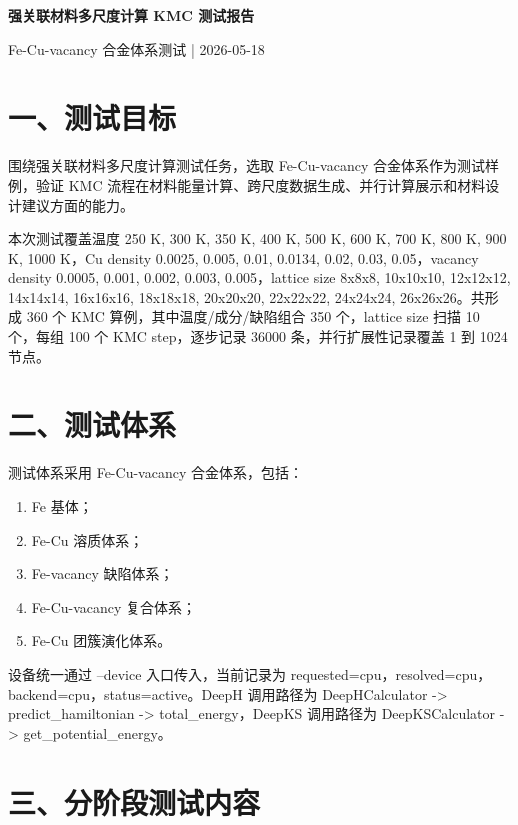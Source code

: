 \documentclass[UTF8,11pt,fontset=none]{ctexart}
\begin{document}
\begin{center}
{\LARGE\bfseries 强关联材料多尺度计算 KMC 测试报告}\par
\vspace{0.35em}
{\normalsize Fe-Cu-vacancy 合金体系测试 | 2026-05-18}\par
\end{center}
\vspace{0.65em}

\section*{一、测试目标}
围绕强关联材料多尺度计算测试任务，选取 Fe-Cu-vacancy 合金体系作为测试样例，验证 KMC 流程在材料能量计算、跨尺度数据生成、并行计算展示和材料设计建议方面的能力。

本次测试覆盖温度 250 K, 300 K, 350 K, 400 K, 500 K, 600 K, 700 K, 800 K, 900 K, 1000 K，Cu density 0.0025, 0.005, 0.01, 0.0134, 0.02, 0.03, 0.05，vacancy density 0.0005, 0.001, 0.002, 0.003, 0.005，lattice size 8x8x8, 10x10x10, 12x12x12, 14x14x14, 16x16x16, 18x18x18, 20x20x20, 22x22x22, 24x24x24, 26x26x26。共形成 360 个 KMC 算例，其中温度/成分/缺陷组合 350 个，lattice size 扫描 10 个，每组 100 个 KMC step，逐步记录 36000 条，并行扩展性记录覆盖 1 到 1024 节点。

\section*{二、测试体系}
测试体系采用 Fe-Cu-vacancy 合金体系，包括：
\begin{enumerate}
\item Fe 基体；
\item Fe-Cu 溶质体系；
\item Fe-vacancy 缺陷体系；
\item Fe-Cu-vacancy 复合体系；
\item Fe-Cu 团簇演化体系。
\end{enumerate}

设备统一通过 --device 入口传入，当前记录为 requested=cpu，resolved=cpu，backend=cpu，status=active。DeepH 调用路径为 DeepHCalculator -> predict\_hamiltonian -> total\_energy，DeepKS 调用路径为 DeepKSCalculator -> get\_potential\_energy。

\section*{三、分阶段测试内容}
\end{document}
